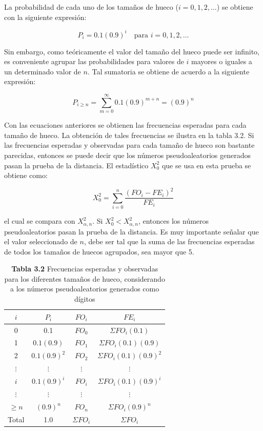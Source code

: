 \documentclass[11pt,letterpaper]{report}
\begin{document}
La probabilidad de cada uno de los tamaños de hueco ($i=0,1,2,\ldots$)
se obtiene con la siguiente expresión:

\begin{equation}
P_i = 0.1(0.9)^i \quad \text{para } i = 0, 1, 2, \ldots
\end{equation}

Sin embargo, como teóricamente el valor del tamaño del hueco puede ser
infinito, es conveniente agrupar las probabilidades para valores de $i$
mayores o iguales a un determinado valor de $n$. Tal sumatoria se
obtiene de acuerdo a la siguiente expresión:

\begin{equation}
P_{i \ge n} = \sum_{m=0}^{\infty} 0.1(0.9)^{m+n} = (0.9)^n
\end{equation}

Con las ecuaciones anteriores se obtienen las frecuencias esperadas para
cada tamaño de hueco. La obtención de tales frecuencias se ilustra en la
tabla 3.2. Si las frecuencias esperadas y observadas para cada tamaño de
hueco son bastante parecidas, entonces se puede decir que los números
pseudoaleatorios generados pasan la prueba de la distancia. El
estadístico $X_0^2$ que se usa en esta prueba se obtiene como:

\begin{equation}
X_0^2 = \sum_{i=0}^{n} \frac{(FO_i - FE_i)^2}{FE_i}
\end{equation}

el cual se compara con $X^2_{\alpha,n}$. Si $X_0^2 < X^2_{\alpha,n}$,
entonces los números pseudoaleatorios pasan la prueba de la distancia.
Es muy importante señalar que el valor seleccionado de $n$, debe ser tal
que la suma de las frecuencias esperadas de todos los tamaños de huecos
agrupados, sea mayor que 5.

\begin{table}[H]
\centering
\caption*{\textbf{Tabla 3.2} Frecuencias esperadas y observadas para los diferentes tamaños de hueco, considerando a los números pseudoaleatorios generados como dígitos}
\begin{tabular}{cccc}
\toprule
$i$ & $P_i$ & $FO_i$ & $FE_i$ \\
\midrule
0 & 0.1 & $FO_0$ & $\Sigma FO_i (0.1)$ \\
1 & $0.1(0.9)$ & $FO_1$ & $\Sigma FO_i (0.1)(0.9)$ \\
2 & $0.1(0.9)^2$ & $FO_2$ & $\Sigma FO_i (0.1)(0.9)^2$ \\
$\vdots$ & $\vdots$ & $\vdots$ & $\vdots$ \\
$i$ & $0.1(0.9)^i$ & $FO_i$ & $\Sigma FO_i (0.1)(0.9)^i$ \\
$\vdots$ & $\vdots$ & $\vdots$ & $\vdots$ \\
$\ge n$ & $(0.9)^n$ & $FO_n$ & $\Sigma FO_i (0.9)^n$ \\
\midrule
Total & 1.0 & $\Sigma FO_i$ & $\Sigma FO_i$ \\
\bottomrule
\end{tabular}
\end{table}
\end{document}
